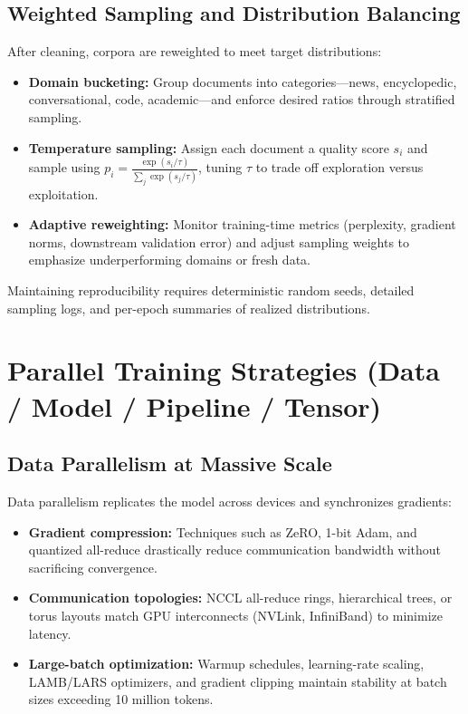 \documentclass{article}
\begin{document}
\subsection{Weighted Sampling and Distribution Balancing}
After cleaning, corpora are reweighted to meet target distributions:
\begin{itemize}
  \item \textbf{Domain bucketing:} Group documents into categories—news, encyclopedic, conversational, code, academic—and enforce desired ratios through stratified sampling.
  \item \textbf{Temperature sampling:} Assign each document a quality score $s_i$ and sample using $p_i = \frac{\exp(s_i/\tau)}{\sum_j \exp(s_j/\tau)}$, tuning $\tau$ to trade off exploration versus exploitation.
  \item \textbf{Adaptive reweighting:} Monitor training-time metrics (perplexity, gradient norms, downstream validation error) and adjust sampling weights to emphasize underperforming domains or fresh data.
\end{itemize}
Maintaining reproducibility requires deterministic random seeds, detailed sampling logs, and per-epoch summaries of realized distributions.

\section{Parallel Training Strategies (Data / Model / Pipeline / Tensor)}
\subsection{Data Parallelism at Massive Scale}
Data parallelism replicates the model across devices and synchronizes gradients:
\begin{itemize}
  \item \textbf{Gradient compression:} Techniques such as ZeRO, 1-bit Adam, and quantized all-reduce drastically reduce communication bandwidth without sacrificing convergence.
  \item \textbf{Communication topologies:} NCCL all-reduce rings, hierarchical trees, or torus layouts match GPU interconnects (NVLink, InfiniBand) to minimize latency.
  \item \textbf{Large-batch optimization:} Warmup schedules, learning-rate scaling, LAMB/LARS optimizers, and gradient clipping maintain stability at batch sizes exceeding 10 million tokens.
\end{itemize}
\end{document}
